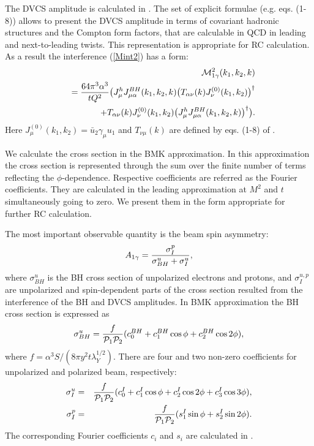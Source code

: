 \documentclass[aps,prd,reprint,groupedaddress,preprintnumbers,showpacs]{revtex4-1}
\begin{document}
The DVCS amplitude is calculated in \cite{BKM2002}. The set of explicit 
formulae (e.g. eqs. (1-8)) allows to present the DVCS amplitude in terms of covariant hadronic structures and the Compton form factors, that are calculable in QCD in leading and next-to-leading twists.  This representation is appropriate for RC calculation.  As a result the interference (\ref{Mint2}) has a form:
\begin{eqnarray}
&&{\cal M}_{1\gamma}^2(k_1,k_2,k)
\nonumber\\&&
=
\frac{64\pi^3\alpha^3}{tQ^2} 
\bigl(
J^h_\mu J^{BH}_{\mu\alpha }(k_1,k_2,k)
\bigl(T_{\alpha\nu}(k)J_\nu^{(0)}(k_1,k_2)\bigr)^{\dagger}
\nonumber\\&&
\qquad \;\;\;+
T_{\alpha\nu}(k)J_\nu^{(0)}(k_1,k_2)
\bigl(J^h_\mu J^{BH}_{\mu\alpha }(k_1,k_2,k)\bigr)^{\dagger}
\bigr).
\label{Mint2b}
\end{eqnarray}
Here $J_\mu^{(0)}(k_1,k_2)={\bar u}_2 \gamma_\mu{u}_1$ and $T_{\nu\mu}(k)$ are defined by eqs. (1-8) of \cite{BKM2002}.


We calculate the cross section in the BMK approximation. In this approximation the cross section is represented through the sum over the finite number of terms  reflecting the $\phi$-dependence. Respective coefficients are referred as the Fourier coefficients. They are calculated in the leading approximation at $M^2$ and $t$ simultaneously going to zero. We present them in the form appropriate for further RC calculation.

The most important observable quantity is the beam spin asymmetry:
\begin{equation}\label{eq11}
A_{1\gamma}={\sigma_I^p\over \sigma_{BH}^u +\sigma_I^u},
\end{equation}
where $\sigma^u_{BH}$ is the BH cross section of unpolarized electrons and protons, and  $\sigma_I^{u,p}$ are unpolarized and spin-dependent parts of the cross section resulted from the interference of the BH and DVCS amplitudes.  
In BMK approximation the BH cross section is expressed as
\begin{equation}
\sigma_{BH}^u=\frac{f}{{\cal P}_1{\cal P}_2}(c_0^{BH}+c_1^{BH}\cos\phi
+c_2^{BH}\cos 2\phi),
\end{equation}
where $f=\alpha^3 S/(8\pi y^2t\lambda_Y^{1/2})$. 
There are four and two non-zero coefficients for unpolarized and polarized beam, respectively:
\begin{eqnarray}\label{scc0}
\sigma_I^{u}&=&\frac{f}{{\cal P}_1{\cal P}_2}(c_0^I+c_1^I\cos\phi+c_2^I\cos 2\phi+c_3^I\cos 3\phi),
\nonumber \\
\sigma_I^{p}&=&\frac{f}{{\cal P}_1{\cal P}_2}(s_1^I\sin\phi+s_2^I\sin 2\phi).
\end{eqnarray}
The corresponding Fourier coefficients $c_i$ and $s_i$ are calculated in \cite{BKM2002}. 
     
\end{document}
